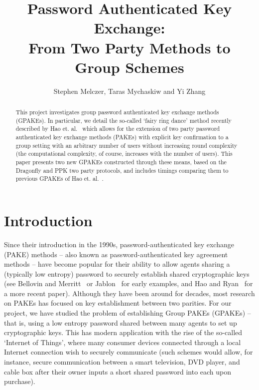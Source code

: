\documentclass{amsart}
\author{Stephen Melczer, Taras Mychaskiw and Yi Zhang}
\title{Password Authenticated Key Exchange:\\ From Two Party Methods to Group Schemes}
\theoremstyle{remark}
\begin{document}
\begin{abstract}
This project investigates group password authenticated key exchange methods (GPAKEs).  In 
particular, we detail the so-called `fairy ring dance' method recently described by 
Hao et. al.~\cite{HaYiChSh15} which allows for the extension of two party password authenticated key exchange 
methods (PAKEs) with explicit key confirmation to a group setting with an arbitrary number of users without
increasing round complexity (the computational complexity, of course, increases with the number of users).  
This paper presents two new GPAKEs constructed through these means, based on the 
Dragonfly and PPK two party protocols, and includes timings comparing them to previous GPAKEs of
Hao et. al.~\cite{HaYiChSh15}.
\end{abstract}

\maketitle

\section{Introduction}

Since their introduction in the 1990s, password-authenticated key exchange (PAKE) methods -- 
also known as password-authenticated key agreement methods -- have become popular for their 
ability to allow agents sharing a (typically low entropy) password to securely establish shared 
cryptographic keys (see Bellovin and Merritt~\cite{BeMe92} or Jablon~\cite{Ja96} for early examples, 
and Hao and Ryan~\cite{HaRy2010} for a more recent paper).  Although they have been around for decades, 
most research on PAKEs has focused on key establishment between two parities.  For our project, we 
have studied the problem of establishing Group PAKEs (GPAKEs) -- that is, using a low entropy password 
shared between many agents to set up cryptographic keys.  This has modern application with the rise
of the so-called `Internet of Things', where many consumer devices connected through a local Internet 
connection wish to securely communicate (such schemes would allow, for instance, secure communication 
between a smart television, DVD player, and cable box after their owner inputs a short shared password 
into each upon purchase).
\\
\end{document}
